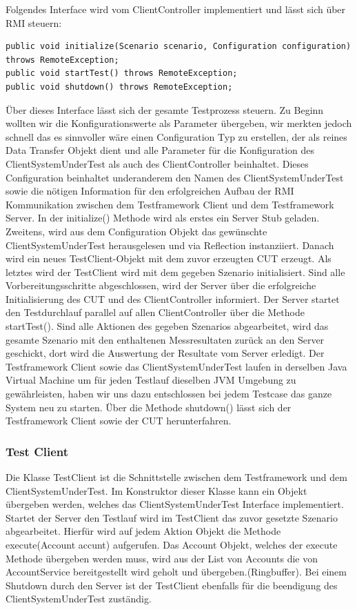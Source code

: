 Folgendes Interface wird vom ClientController implementiert und lässt sich über RMI steuern:
\begin{lstlisting}	
public void initialize(Scenario scenario, Configuration configuration) throws RemoteException;
public void startTest() throws RemoteException;
public void shutdown() throws RemoteException;
\end{lstlisting}
Über dieses Interface lässt sich der gesamte Testprozess steuern. Zu Beginn wollten wir die Konfigurationswerte als Parameter übergeben, wir merkten jedoch schnell das es sinnvoller wäre einen Configuration Typ zu erstellen, der als reines Data Transfer Objekt dient und alle Parameter für die Konfiguration des ClientSystemUnderTest als auch des ClientController beinhaltet. Dieses Configuration beinhaltet underanderem den Namen des ClientSystemUnderTest sowie die nötigen Information für den erfolgreichen Aufbau der RMI Kommunikation zwischen dem Testframework Client und dem Testframework Server. In der initialize() Methode wird als erstes ein Server Stub geladen. Zweitens, wird aus dem Configuration Objekt das gewünschte ClientSystemUnderTest herausgelesen und via Reflection instanziiert. Danach wird ein neues TestClient-Objekt mit dem zuvor erzeugten CUT erzeugt. Als letztes wird der TestClient wird mit dem gegeben Szenario initialisiert. Sind alle Vorbereitungsschritte abgeschlossen, wird der Server über die erfolgreiche Initialisierung des CUT und des ClientController informiert. Der Server startet den Testdurchlauf parallel auf allen ClientController über die Methode startTest(). Sind alle Aktionen des gegeben Szenarios abgearbeitet, wird das gesamte Szenario mit den enthaltenen Messresultaten zurück an den Server geschickt, dort wird die Auswertung der Resultate vom Server erledigt. Der Testframework Client sowie das ClientSystemUnderTest laufen in derselben Java Virtual Machine um für jeden Testlauf dieselben JVM Umgebung zu gewährleisten, haben wir uns dazu entschlossen bei jedem Testcase das ganze System neu zu starten. Über die Methode shutdown() lässt sich der Testframework Client sowie der CUT herunterfahren.

\subsubsection{Test Client}
\label{sec:testclient}
Die Klasse TestClient ist die Schnittstelle zwischen dem Testframework und dem ClientSystemUnderTest. Im Konstruktor dieser Klasse kann ein Objekt übergeben werden, welches das ClientSystemUnderTest Interface implementiert. Startet der Server den Testlauf wird im TestClient das zuvor gesetzte Szenario abgearbeitet. Hierfür wird auf jedem Aktion Objekt die Methode execute(Account accunt) aufgerufen. Das Account Objekt, welches der execute Methode übergeben werden muss, wird aus der List von Accounts die von AccountService bereitgestellt wird geholt und übergeben.(Ringbuffer). Bei einem Shutdown durch den Server ist der TestClient ebenfalls für die beendigung des ClientSystemUnderTest zuständig.

